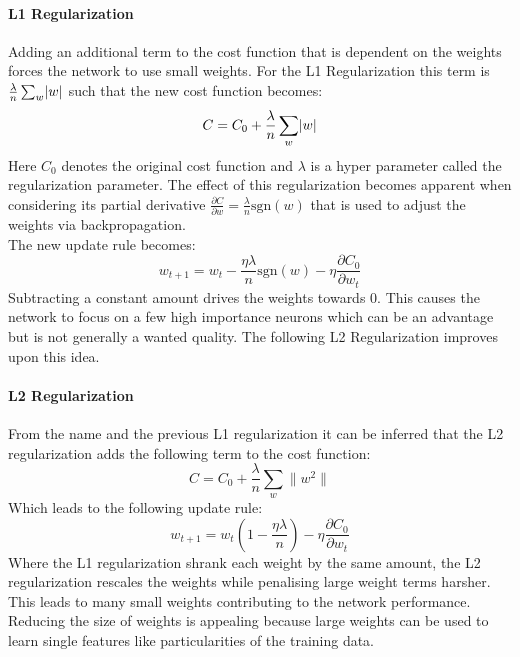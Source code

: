 				\paragraph{L1 Regularization}
					Adding an additional term to the cost function that is dependent on the weights forces the network to use small weights. For the L1 Regularization this term is $\frac{\lambda}{n} \sum_{w}^{\,} \lvert w\rvert$ such that the new cost function becomes:
					\begin{equation}
						C = C_0 + \frac{\lambda}{n} \sum_{w}^{\,} \lvert w\rvert
					\end{equation}
					Here $C_0$ denotes the original cost function and $\lambda$ is a hyper parameter called the regularization parameter. The effect of this regularization becomes apparent when considering its partial derivative $\frac{\partial C}{\partial w} = \frac{\lambda}{n} \mathrm{sgn}(w)$ that is used to adjust the weights via backpropagation.\\
					The new update rule becomes:
					\begin{equation}
						w_{t+1} = w_t  - \frac{\eta \lambda}{n}\mathrm{sgn}(w) - \eta \frac{\partial C_0}{\partial w_t}
					\end{equation}
					Subtracting a constant amount drives the weights towards 0. This causes the network to focus on a few high importance neurons which can be an advantage but is not generally a wanted quality. The following L2 Regularization improves upon this idea.
				\paragraph{L2 Regularization}
					From the name and the previous L1 regularization it can be inferred that the L2 regularization adds the following term to the cost function:
					\begin{equation}
						C = C_0 + \frac{\lambda}{n} \sum_{w}^{\,} \| w^2 \|
					\end{equation}
					Which leads to the following update rule:
					\begin{equation}
						w_{t+1} = w_t \left( 1 - \frac{\eta \lambda}{n}\right) - \eta \frac{\partial C_0}{\partial w_t}
					\end{equation}
					Where the L1 regularization shrank each weight by the same amount, the L2 regularization rescales the weights while penalising large weight terms harsher. This leads to many small weights contributing to the network performance. Reducing the size of weights is appealing because large weights can be used to learn single features like particularities of the training data. 
